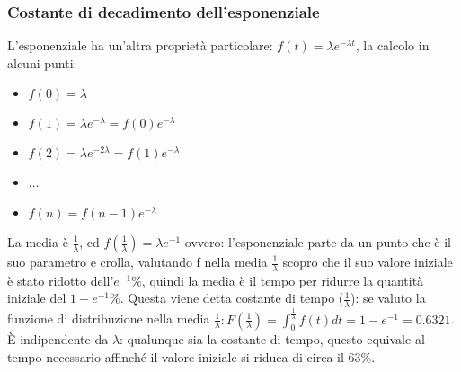 \documentclass{article}
\begin{document}
\subsubsection{Costante di decadimento dell'esponenziale}
L'esponenziale ha un'altra proprietà particolare: $f(t) = \lambda e^{-\lambda t}$, la calcolo in alcuni punti:
\begin{itemize}
\item $f(0) = \lambda$
\item $f(1) = \lambda e^{-\lambda} = f(0)e^{-\lambda}$
\item $f(2) = \lambda e^{-2\lambda} = f(1)e^{-\lambda}$
\item ...
\item $f(n) = f(n-1)e^{-\lambda}$
\end{itemize}
La media è $\frac{1}{\lambda}$, ed $f(\frac{1}{\lambda}) = \lambda e^{-1}$ ovvero: l'esponenziale parte da un punto che è il suo parametro e crolla, valutando f nella media $\frac{1}{\lambda}$ scopro che il suo valore iniziale è stato ridotto dell'$e^{-1}\%$, quindi la media è il tempo per ridurre la quantità iniziale del $1 - e^{-1} \%$. Questa viene detta costante di tempo ($\frac{1}{\lambda}$): se valuto la funzione di distribuzione nella media $\frac{1}{\lambda}: F(\frac{1}{\lambda}) = \int_{0}^{\frac{1}{\lambda}} f(t) dt = 1 - e^{-1} = 0.6321$.\\
È indipendente da $\lambda$: qualunque sia la costante di tempo, questo equivale al tempo necessario affinché il valore iniziale si riduca di circa il $63 \%$.
\end{document}
